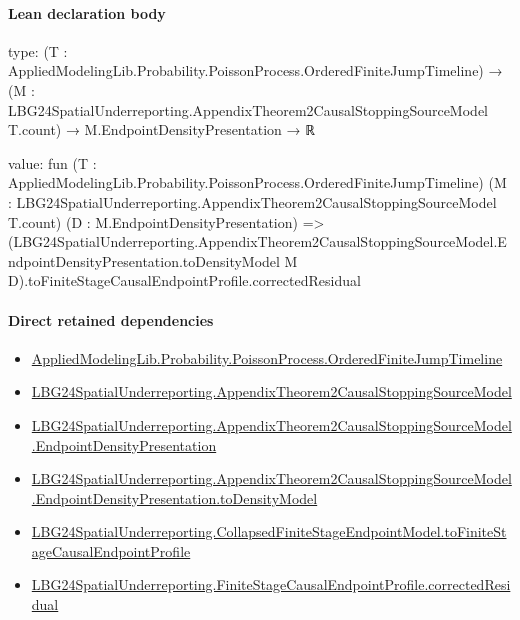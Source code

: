 \documentclass[10pt]{article}
\begin{document}
\paragraph{Lean declaration body}
\begin{ReviewVerbatim}
type:
(T : AppliedModelingLib.Probability.PoissonProcess.OrderedFiniteJumpTimeline) →
  (M : LBG24SpatialUnderreporting.AppendixTheorem2CausalStoppingSourceModel T.count) → M.EndpointDensityPresentation → ℝ

value:
fun (T : AppliedModelingLib.Probability.PoissonProcess.OrderedFiniteJumpTimeline)
    (M : LBG24SpatialUnderreporting.AppendixTheorem2CausalStoppingSourceModel T.count)
    (D : M.EndpointDensityPresentation) =>
  (LBG24SpatialUnderreporting.AppendixTheorem2CausalStoppingSourceModel.EndpointDensityPresentation.toDensityModel M
        D).toFiniteStageCausalEndpointProfile.correctedResidual
\end{ReviewVerbatim}

\paragraph{Direct retained dependencies}
\begin{itemize}\raggedright
\item \hyperlink{governing-declaration-f690c3c90ba9b3a6}{Applied\allowbreak{}Modeling\allowbreak{}Lib.\allowbreak{}Probability.\allowbreak{}Poisson\allowbreak{}Process.\allowbreak{}Ordered\allowbreak{}Finite\allowbreak{}Jump\allowbreak{}Timeline}
\item \hyperlink{paper-prerequisite-2f0b30d7fa1d57d0}{LBG24\allowbreak{}Spatial\allowbreak{}Underreporting.\allowbreak{}Appendix\allowbreak{}Theorem2\allowbreak{}Causal\allowbreak{}Stopping\allowbreak{}Source\allowbreak{}Model}
\item \hyperlink{paper-prerequisite-389857bc4c8477de}{LBG24\allowbreak{}Spatial\allowbreak{}Underreporting.\allowbreak{}Appendix\allowbreak{}Theorem2\allowbreak{}Causal\allowbreak{}Stopping\allowbreak{}Source\allowbreak{}Model.\allowbreak{}Endpoint\allowbreak{}Density\allowbreak{}Presentation}
\item \hyperlink{governing-declaration-d08c9110d52e9643}{LBG24\allowbreak{}Spatial\allowbreak{}Underreporting.\allowbreak{}Appendix\allowbreak{}Theorem2\allowbreak{}Causal\allowbreak{}Stopping\allowbreak{}Source\allowbreak{}Model.\allowbreak{}Endpoint\allowbreak{}Density\allowbreak{}Presentation.\allowbreak{}to\allowbreak{}Density\allowbreak{}Model}
\item \hyperlink{governing-declaration-35284678b98eb590}{LBG24\allowbreak{}Spatial\allowbreak{}Underreporting.\allowbreak{}Collapsed\allowbreak{}Finite\allowbreak{}Stage\allowbreak{}Endpoint\allowbreak{}Model.\allowbreak{}to\allowbreak{}Finite\allowbreak{}Stage\allowbreak{}Causal\allowbreak{}Endpoint\allowbreak{}Profile}
\item \hyperlink{governing-declaration-49dcaba38cad3f68}{LBG24\allowbreak{}Spatial\allowbreak{}Underreporting.\allowbreak{}Finite\allowbreak{}Stage\allowbreak{}Causal\allowbreak{}Endpoint\allowbreak{}Profile.\allowbreak{}corrected\allowbreak{}Residual}
\end{itemize}
\hypertarget{governing-declaration-e6552f42a9fa7521}{}
\end{document}
